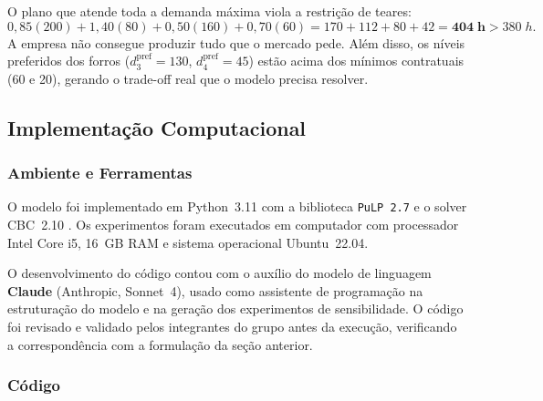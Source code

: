 O plano que atende toda a demanda máxima viola a restrição de teares:
\[
  0{,}85(200) + 1{,}40(80) + 0{,}50(160) + 0{,}70(60)
  = 170 + 112 + 80 + 42 = \mathbf{404 \; h} > 380 \; h.
\]
A empresa não consegue produzir tudo que o mercado pede. Além disso, os níveis
preferidos dos forros ($d_3^{\text{pref}} = 130$, $d_4^{\text{pref}} = 45$)
estão acima dos mínimos contratuais (60 e 20), gerando o trade-off real que o
modelo precisa resolver.

\newpage

\subsection{Implementação Computacional}
\label{sec:impl}

\subsubsection{Ambiente e Ferramentas}

O modelo foi implementado em Python~3.11 com a biblioteca \texttt{PuLP~2.7} e
o solver CBC~2.10 \cite{mitchell2011}. Os experimentos foram executados em
computador com processador Intel Core i5, 16~GB RAM e sistema operacional
Ubuntu~22.04.

O desenvolvimento do código contou com o auxílio do modelo de linguagem
\textbf{Claude} (Anthropic, Sonnet~4), usado como assistente de programação
na estruturação do modelo e na geração dos experimentos de sensibilidade. O
código foi revisado e validado pelos integrantes do grupo antes da execução,
verificando a correspondência com a formulação da seção anterior.

\subsubsection{Código}

